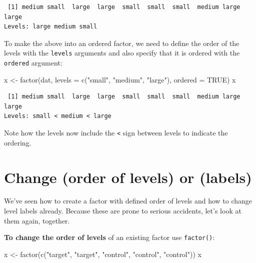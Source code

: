 \documentclass[
]{book}
\newenvironment{Shaded}{\begin{snugshade}}{\end{snugshade}}
\newcommand{\AttributeTok}[1]{\textcolor[rgb]{0.77,0.63,0.00}{#1}}
\newcommand{\ConstantTok}[1]{\textcolor[rgb]{0.00,0.00,0.00}{#1}}
\newcommand{\FunctionTok}[1]{\textcolor[rgb]{0.00,0.00,0.00}{#1}}
\newcommand{\NormalTok}[1]{#1}
\newcommand{\OtherTok}[1]{\textcolor[rgb]{0.56,0.35,0.01}{#1}}
\newcommand{\StringTok}[1]{\textcolor[rgb]{0.31,0.60,0.02}{#1}}
\begin{document}
\begin{verbatim}
 [1] medium small  large  large  small  small  small  medium large  large 
Levels: large medium small
\end{verbatim}

To make the above into an ordered factor, we need to define the order of the levels with the \texttt{levels} arguments and also specify that it is ordered with the \texttt{ordered} argument:

\begin{Shaded}
\begin{Highlighting}[]
\NormalTok{x }\OtherTok{\textless{}{-}} \FunctionTok{factor}\NormalTok{(dat,}
            \AttributeTok{levels =} \FunctionTok{c}\NormalTok{(}\StringTok{"small"}\NormalTok{, }\StringTok{"medium"}\NormalTok{, }\StringTok{"large"}\NormalTok{),}
            \AttributeTok{ordered =} \ConstantTok{TRUE}\NormalTok{)}
\NormalTok{x}
\end{Highlighting}
\end{Shaded}

\begin{verbatim}
 [1] medium small  large  large  small  small  small  medium large  large 
Levels: small < medium < large
\end{verbatim}

Note how the levels now include the \texttt{\textless{}} sign between levels to indicate the ordering.

\hypertarget{change-order-of-levels-or-labels}{%
\section{Change (order of levels) or (labels)}\label{change-order-of-levels-or-labels}}

We've seen how to create a factor with defined order of levels and how to change level labels already. Because these are prone to serious accidents, let's look at them again, together.

\textbf{To change the order of levels} of an existing factor use \texttt{factor()}:

\begin{Shaded}
\begin{Highlighting}[]
\NormalTok{x }\OtherTok{\textless{}{-}} \FunctionTok{factor}\NormalTok{(}\FunctionTok{c}\NormalTok{(}\StringTok{"target"}\NormalTok{, }\StringTok{"target"}\NormalTok{, }\StringTok{"control"}\NormalTok{, }\StringTok{"control"}\NormalTok{, }\StringTok{"control"}\NormalTok{))}
\NormalTok{x}
\end{Highlighting}
\end{Shaded}
\end{document}
